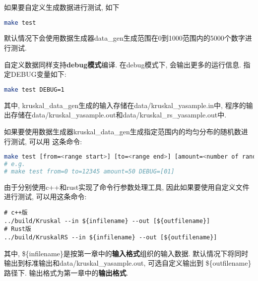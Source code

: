 如果要自定义生成数据进行测试, 如下
\begin{lstlisting}[language=bash]
make test
\end{lstlisting}
默认情况下会使用数据生成器data\_gen生成范围在0到1000范围内的5000个数字进行测试.\par

自定义数据同样支持\textbf{debug模式}编译. 在debug模式下, 会输出更多的运行信息.
指定DEBUG变量如下:
\begin{lstlisting}[language=bash]
make test DEBUG=1
\end{lstlisting}

其中, kruskal\_data\_gen生成的输入存储在data/kruskal\_yasample.in中,
程序的输出存储在data/kruskal\_yasample.out和data/kruskal\_rs\_yasample.out中. \par

如果要使用数据生成器kruskal\_data\_gen生成指定范围内的均匀分布的随机数进行测试, 可以用
这条命令:
\begin{lstlisting}[language=bash]
make test [from=<range start>] [to=<range end>] [amount=<number of random numbers>]
# e.g. 
# make test from=0 to=12345 amount=50 DEBUG=[01]
\end{lstlisting}

由于分别使用c++和rust实现了命令行参数处理工具, 因此如果要使用自定义文件进行测试,
可以用这条命令:
\begin{lstlisting}
# c++版
../build/Kruskal --in ${infilename} --out [${outfilename}]
# Rust版
../build/KruskalRS --in ${infilename} --out [${outfilename}]
\end{lstlisting}
其中, \$\{infilename\}是按第一章中的\textbf{输入格式}组织的输入数据.
默认情况下将同时输出到标准输出和data/kruskal\_yasample.out, 可选自定义输出到
\$\{outfilename\}路径下. 输出格式为第一章中的\textbf{输出格式}.

